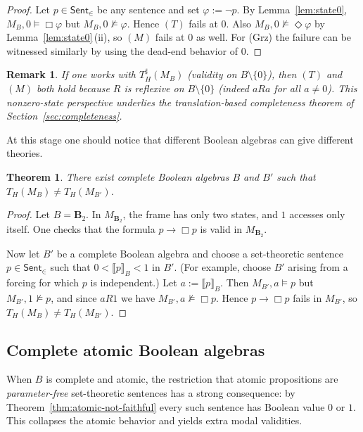 \documentclass[10pt,a4paper]{amsart}
\newtheorem{remark}[definition]{Remark}
\newtheorem{theorem}[definition]{Theorem}
\newcommand{\Sent}{\mathsf{Sent}}
\newcommand{\val}[1]{\llbracket #1\rrbracket_B}
\newcommand{\Btwo}{\mathbf{B}_2}
\begin{document}
\begin{proof}
Let $p\in\Sent_{\in}$ be any sentence and set $\varphi:=\neg p$.
By Lemma~\ref{lem:state0}, $M_B,0\models \Box\varphi$ but $M_B,0\not\models \varphi$.
Hence $(T)$ fails at $0$.
Also $M_B,0\not\models \Diamond\varphi$ by Lemma~\ref{lem:state0}$\,$(ii), so $(M)$ fails at $0$ as well.
For (Grz) the failure can be witnessed similarly by using the dead-end behavior of $0$.
\end{proof}

\begin{remark}\label{rem:nonzero-bridge}
If one works with $T_H^\sharp(M_B)$ (validity on $B\setminus\{0\}$), then $(T)$ and $(M)$ both hold because
$R$ is reflexive on $B\setminus\{0\}$ (indeed $aRa$ for all $a\ne 0$). This nonzero-state perspective
underlies the translation-based completeness theorem of Section~\ref{sec:completeness}.
\end{remark}

At this stage one should notice that different Boolean algebras can give different theories.

\begin{theorem}\label{thm:different-theories}
There exist complete Boolean algebras $B$ and $B'$ such that $T_H(M_B)\ne T_H(M_{B'})$.
\end{theorem}

\begin{proof}
Let $B=\Btwo$. In $M_{\Btwo}$, the frame has only two states, and $1$ accesses only itself.
One checks that the formula $p\to \Box p$ is valid in $M_{\Btwo}$.

Now let $B'$ be a complete Boolean algebra and choose a set-theoretic sentence $p\in\Sent_{\in}$ such that
$0<\val{p}<1$ in $B'$. (For example, choose $B'$ arising from a forcing for which $p$ is independent.)
Let $a:=\val{p}$.
Then $M_{B'},a\models p$ but $M_{B'},1\not\models p$, and since $aR1$ we have $M_{B'},a\not\models \Box p$.
Hence $p\to\Box p$ fails in $M_{B'}$, so $T_H(M_B)\ne T_H(M_{B'})$.
\end{proof}

\subsection{Complete atomic Boolean algebras}

When $B$ is complete and atomic, the restriction that atomic propositions are \emph{parameter-free}
set-theoretic sentences has a strong consequence: by Theorem~\ref{thm:atomic-not-faithful} every such
sentence has Boolean value $0$ or $1$. This collapses the atomic behavior and yields extra modal validities.
\end{document}
